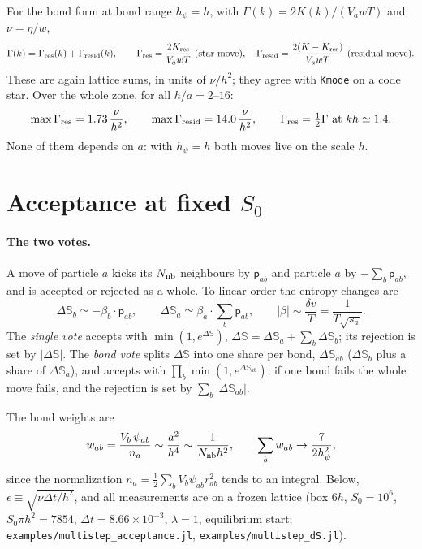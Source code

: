 \documentclass[11pt,aps,preprint,nofootinbib,superscriptaddress,tightenlines]{revtex4-2}
\def\st{\begin{equation}}
\def\stp{\end{equation}}
\let\oldparagraph\paragraph
\renewcommand{\paragraph}{\par\bigskip\oldparagraph}
\begin{document}
For the bond form at bond range $h_\psi=h$, with $\Gamma(k)=2K(k)/(V_awT)$ and
$\nu=\eta/w$,
\st
\Gamma(k)=\Gamma_{\rm res}(k)+\Gamma_{\rm resid}(k),\qquad
\Gamma_{\rm res}=\frac{2K_{\rm res}}{V_awT}\ \text{(star move)},\quad
\Gamma_{\rm resid}=\frac{2(K-K_{\rm res})}{V_awT}\ \text{(residual move)} .
\stp
These are again lattice sums, in units of $\nu/h^2$; they agree with
\texttt{Kmode} on a code star.  Over the whole zone, for all $h/a=2$--$16$:
\st
\max\Gamma_{\rm res}=1.73\,\frac{\nu}{h^2},\qquad
\max\Gamma_{\rm resid}=14.0\,\frac{\nu}{h^2},\qquad
\Gamma_{\rm res}=\tfrac12\Gamma\ \text{at}\ kh\simeq1.4 .
\stp
None of them depends on $a$: with $h_\psi=h$ both moves live on the scale $h$.

\section{Acceptance at fixed $S_0$}

\paragraph{The two votes.}  A move of particle $a$ kicks its $N_{\rm nb}$ neighbours by
$\bm{\mathsf p}_{ab}$ and particle $a$ by $-\sum_b\bm{\mathsf p}_{ab}$, and is accepted or rejected as a
whole.  To linear order the entropy changes are
\st
\Delta\mathbb S_b\simeq-\beta_b\cdot\bm{\mathsf p}_{ab},\qquad
\Delta\mathbb S_a\simeq\beta_a\cdot\sum_b\bm{\mathsf p}_{ab},\qquad
|\beta|\sim\frac{\delta v}{T}=\frac{1}{T\sqrt{s_a}} .
\stp
The \emph{single vote} accepts with $\min(1,e^{\Delta\mathbb S})$,
$\Delta\mathbb S=\Delta\mathbb S_a+\sum_b\Delta\mathbb S_b$; its rejection is set by $|\Delta\mathbb S|$.  The
\emph{bond vote} splits $\Delta\mathbb S$ into one share per bond, $\Delta\mathbb S_{ab}$ ($\Delta\mathbb S_b$
plus a share of $\Delta\mathbb S_a$), and accepts with $\prod_b\min(1,e^{\Delta\mathbb S_{ab}})$; if
one bond fails the whole move fails, and the rejection is set by $\sum_b|\Delta\mathbb S_{ab}|$.

The bond weights are
\st
w_{ab}=\frac{V_b\,\psi_{ab}}{n_a}\sim\frac{a^2}{h^4}\sim\frac{1}{N_{\rm nb}h^2},\qquad
\sum_bw_{ab}\to\frac{7}{2h_\psi^2},
\stp
since the normalization $n_a=\frac12\sum_bV_b\psi_{ab}r_{ab}^2$ tends to an integral.
Below, $\epsilon\equiv\sqrt{\nu\Delta t/h^2}$, and all measurements are on a frozen lattice
(box $6h$, $S_0=10^6$, $S_0\pi h^2=7854$, $\Delta t=8.66\times10^{-3}$, $\lambda=1$,
equilibrium start; \texttt{examples/multistep\_acceptance.jl},
\texttt{examples/multistep\_dS.jl}).
\end{document}
